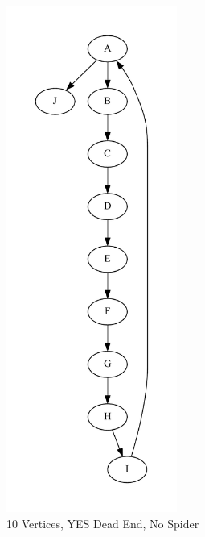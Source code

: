 \documentclass{article}
\begin{document}
\begin{figure}
  \centering
  \includegraphics[width=0.5\textwidth]{graph3.pdf}
  \caption{10 Vertices, YES Dead End, No Spider}
  \label{fig:image_label}
\end{figure}
\end{document}
